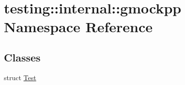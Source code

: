 \hypertarget{namespacetesting_1_1internal_1_1gmockpp}{}\section{testing\+::internal\+::gmockpp Namespace Reference}
\label{namespacetesting_1_1internal_1_1gmockpp}
\subsection*{Classes}
\begin{DoxyCompactItemize}
\item 
struct \mbox{\hyperlink{structtesting_1_1internal_1_1gmockpp_1_1_test}{Test}}
\end{DoxyCompactItemize}
